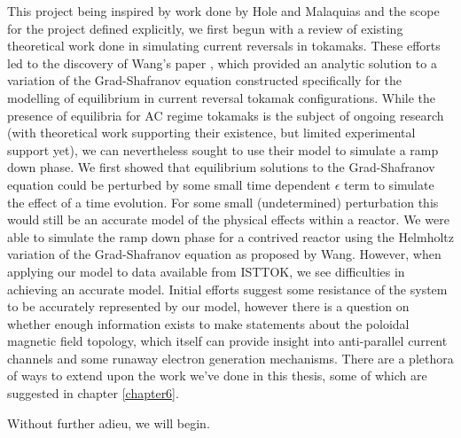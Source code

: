 This project being inspired by work done by Hole and Malaquias and the scope for the project defined explicitly, 
we first begun with a review of existing theoretical work done in simulating current reversals in tokamaks. These 
efforts led to the discovery of Wang's paper \cite{wang-analytic-solution}, which provided an analytic solution 
to a variation of the Grad-Shafranov equation constructed specifically for the modelling of equilibrium in 
current reversal tokamak configurations. While the presence of equilibria for AC regime tokamaks is the subject of 
ongoing research (with theoretical work supporting their existence, but limited experimental support yet), 
we can nevertheless sought to use their model to simulate a ramp down phase. We first showed that equilibrium 
solutions to the Grad-Shafranov equation could be perturbed by some small time dependent $\epsilon$ term to 
simulate the effect of a time evolution. For some small (undetermined) perturbation this would still be an accurate 
model of the physical effects within a reactor. We were able to simulate the ramp down phase for a contrived reactor using 
the Helmholtz variation of the Grad-Shafranov equation as proposed by Wang. However, when applying our model to 
data available from ISTTOK, we see difficulties in achieving an accurate model. Initial efforts suggest some resistance 
of the system to be accurately represented by our model, however there is a question on whether enough 
information exists to make statements about the poloidal magnetic field topology, which itself can provide 
insight into anti-parallel current channels and some runaway electron generation mechanisms. There are a 
plethora of ways to extend upon the work we've done in this thesis, some of which are suggested in chapter \ref{chapter6}.

Without further adieu, we will begin.
